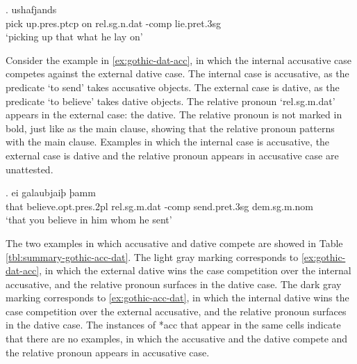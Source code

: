 \exg. ushafjands    \\
{pick up}.\ac{pres}.\ac{ptcp}\scsub{[acc]} on\scsub{[dat]} \ac{rel}.\ac{sg}.\ac{n}.\ac{dat} -\ac{comp} lie.\ac{pret}.3\ac{sg}\\
`picking up that what he lay on' \label{ex:gothic-acc-dat}

Consider the example in \ref{ex:gothic-dat-acc}, in which the internal accusative case competes against the external dative case.
The internal case is accusative, as the predicate  `to send' takes accusative objects.
The external case is dative, as the predicate  `to believe' takes dative objects.
The relative pronoun  `\ac{rel}.\ac{sg}.\ac{m}.\ac{dat}' appears in the external case: the dative. The relative pronoun is not marked in bold, just like as the main clause, showing that the relative pronoun patterns with the main clause.
Examples in which the internal case is accusative, the external case is dative and the relative pronoun appears in accusative case are unattested.

\exg. ei galaubjaiþ þamm   \\
that believe.\ac{opt}.\ac{pres}.2\ac{pl}\scsub{[dat]} \ac{rel}.\ac{sg}.\ac{m}.\ac{dat} -\ac{comp} {send}.\ac{pret}.3\ac{sg}\scsub{[acc]} \ac{dem}.\ac{sg}.\ac{m}.\ac{nom}\\
`that you believe in him whom he sent' \label{ex:gothic-dat-acc}

The two examples in which accusative and dative compete are showed in Table \ref{tbl:summary-gothic-acc-dat}. The light gray marking corresponds to \ref{ex:gothic-dat-acc}, in which the external dative wins the case competition over the internal accusative, and the relative pronoun surfaces in the dative case. The dark gray marking corresponds to \ref{ex:gothic-acc-dat}, in which the internal dative wins the case competition over the external accusative, and the relative pronoun surfaces in the dative case. The instances of *\ac{acc} that appear in the same cells indicate that there are no examples, in which the accusative and the dative compete and the relative pronoun appears in accusative case.

